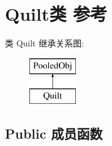 \hypertarget{class_quilt}{}\section{Quilt类 参考}
\label{class_quilt}
类 Quilt 继承关系图\+:\begin{figure}[H]
\begin{center}
\leavevmode
\includegraphics[height=2.000000cm]{class_quilt}
\end{center}
\end{figure}
\subsection*{Public 成员函数}
